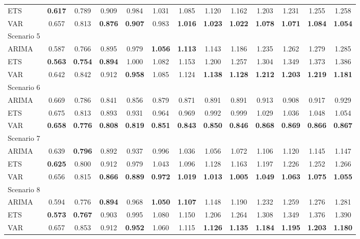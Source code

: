\begin{table}[!htb]
{\begin{tabular}{lcccccccccccc}
ETS & \textbf{0.617} & 0.789 & 0.909 & 0.984 & 1.031 & 1.085 & 1.120 & 1.162 & 1.203 & 1.231 & 1.255 & 1.258\\
VAR & 0.657 & 0.813 & \textbf{0.876} & \textbf{0.907} & 0.983 & \textbf{1.016} & \textbf{1.023} & \textbf{1.022} & \textbf{1.078} & \textbf{1.071} & \textbf{1.084} & \textbf{1.054}\\
\hline
Scenario 5\\
\hline
ARIMA & 0.587 & 0.766 & 0.895 & 0.979 & \textbf{1.056} & \textbf{1.113} & 1.143 & 1.186 & 1.235 & 1.262 & 1.279 & 1.285\\
ETS & \textbf{0.563} & \textbf{0.754} & \textbf{0.894} & 1.000 & 1.082 & 1.153 & 1.200 & 1.257 & 1.304 & 1.349 & 1.373 & 1.386\\
VAR & 0.642 & 0.842 & 0.912 & \textbf{0.958} & 1.085 & 1.124 & \textbf{1.138} & \textbf{1.128} & \textbf{1.212} & \textbf{1.203} & \textbf{1.219} & \textbf{1.181}\\
\hline
Scenario 6\\
\hline
ARIMA & 0.669 & 0.786 & 0.841 & 0.856 & 0.879 & 0.871 & 0.891 & 0.891 & 0.913 & 0.908 & 0.917 & 0.929\\
ETS & 0.675 & 0.813 & 0.893 & 0.931 & 0.964 & 0.969 & 0.992 & 0.999 & 1.029 & 1.036 & 1.048 & 1.054\\
VAR & \textbf{0.658} & \textbf{0.776} & \textbf{0.808} & \textbf{0.819} & \textbf{0.851} & \textbf{0.843} & \textbf{0.850} & \textbf{0.846} & \textbf{0.868} & \textbf{0.869} & \textbf{0.866} & \textbf{0.867}\\
\hline
Scenario 7\\
\hline
ARIMA & 0.639 & \textbf{0.796} & 0.892 & 0.937 & 0.996 & 1.036 & 1.056 & 1.072 & 1.106 & 1.120 & 1.145 & 1.147\\
ETS & \textbf{0.625} & 0.800 & 0.912 & 0.979 & 1.043 & 1.096 & 1.128 & 1.163 & 1.197 & 1.226 & 1.252 & 1.266\\
VAR & 0.656 & 0.815 & \textbf{0.866} & \textbf{0.889} & \textbf{0.972} & \textbf{1.019} & \textbf{1.013} & \textbf{1.005} & \textbf{1.049} & \textbf{1.063} & \textbf{1.075} & \textbf{1.055}\\
\hline
Scenario 8\\
\hline
ARIMA & 0.594 & 0.776 & \textbf{0.894} & 0.968 & \textbf{1.050} & \textbf{1.107} & 1.148 & 1.190 & 1.232 & 1.259 & 1.276 & 1.281\\
ETS & \textbf{0.573} & \textbf{0.767} & 0.903 & 0.995 & 1.080 & 1.150 & 1.206 & 1.264 & 1.308 & 1.349 & 1.376 & 1.390\\
VAR & 0.657 & 0.853 & 0.912 & \textbf{0.952} & 1.060 & 1.115 & \textbf{1.126} & \textbf{1.135} & \textbf{1.184} & \textbf{1.195} & \textbf{1.203} & \textbf{1.180}\\

\end{tabular}}
\end{table}
